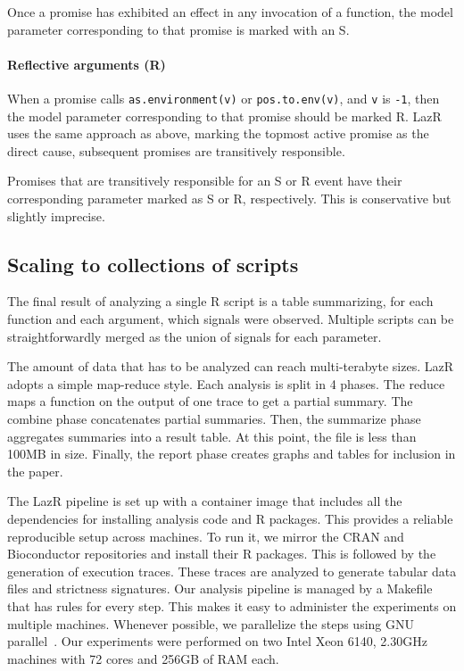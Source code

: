 \documentclass[review,creen,acmsmall]{acmart}
\newcommand{\code}[1]{\lstinline |#1|\xspace}
\renewcommand{\c}[1]{\lstinline |#1|\xspace}
\newcommand{\lazr}{{\sf LazR}\xspace}
\begin{document}
Once a promise has exhibited an effect in any invocation of a function, the
model parameter corresponding to that promise is marked with an S.

\paragraph{Reflective arguments (R)}
When a promise calls \code{as.environment(v)} or \code{pos.to.env(v)}, and
\c v is \c{-1}, then the model parameter corresponding to that promise should be
marked R. \lazr uses the same approach as above, marking the topmost active
promise as the direct cause, subsequent promises are transitively responsible.

\medskip

Promises that are transitively responsible for an S or R event have their
corresponding parameter marked as S or R, respectively. This is conservative but
slightly imprecise.

\newpage
\subsection{Scaling to collections of scripts}

The final result of analyzing a single R script is a table summarizing, for each
function and each argument, which signals were observed. Multiple scripts can be
straightforwardly merged as the union of signals for each parameter.

The amount of data that has to be analyzed can reach multi-terabyte sizes. \lazr adopts
a simple map-reduce style. Each analysis is split in 4 phases. The reduce maps
a function on the output of one trace to get a partial summary. The combine
phase concatenates partial summaries. Then, the summarize phase aggregates
summaries into a result table. At this point, the file is less than 100MB in
size. Finally, the report phase creates graphs and tables for inclusion in
the paper.

The \lazr pipeline is set up with a container image that includes all the
dependencies for installing analysis code and R packages. This provides a
reliable reproducible setup across machines. To run it, we mirror the CRAN and
Bioconductor repositories and install their R packages. This is followed by the
generation of execution traces. These traces are analyzed to generate tabular
data files and strictness signatures. Our analysis pipeline is managed by a
Makefile that has rules for every step. This makes it easy to administer the
experiments on multiple machines. Whenever possible, we parallelize the steps
using GNU parallel~\cite{gnuparallel}. Our experiments were performed on two Intel
Xeon 6140, 2.30GHz machines with 72 cores and 256GB of RAM each.
\end{document}
